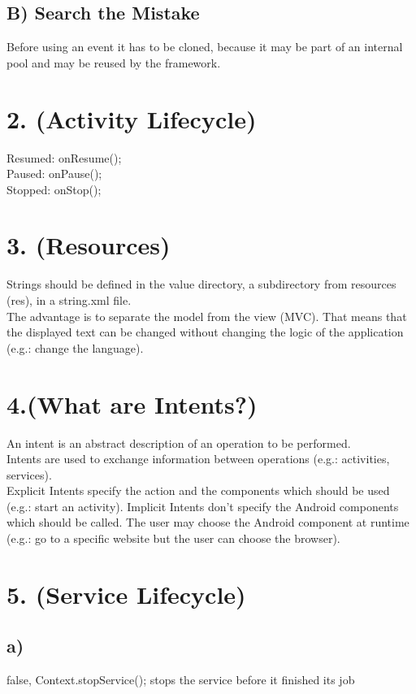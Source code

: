 \documentclass[10pt,a4paper]{report}
\begin{document}
				
		\subsection*{B) Search the Mistake}
			Before using an event it has to be cloned, because it may be part of an internal pool and may be reused by the framework. \\
		
	\section*{2. (Activity Lifecycle)}
		Resumed: onResume(); \\
		Paused: onPause(); \\
		Stopped: onStop(); \\
	
	\section*{3. (Resources)}
		Strings should be defined in the value directory, a subdirectory from resources (res), in a string.xml file. \\
		The advantage is to separate the model from the view (MVC). That means that the displayed text can be changed without changing the logic of the application (e.g.: change the language). \\
	
	\section*{4.(What are Intents?)}
		An intent is an abstract description of an operation to be performed. \\
		Intents are used to exchange information between operations (e.g.: activities, services). \\
		Explicit Intents specify the action and the components which should be used (e.g.: start an activity). Implicit Intents don't specify the Android components which should be called. The user may choose the Android component at runtime (e.g.: go to a specific website but the user can choose the browser). \\
	
	\section*{5. (Service Lifecycle)}
		\subsection*{a)}
			false, Context.stopService(); stops the service before it finished its job
		
\end{document}

